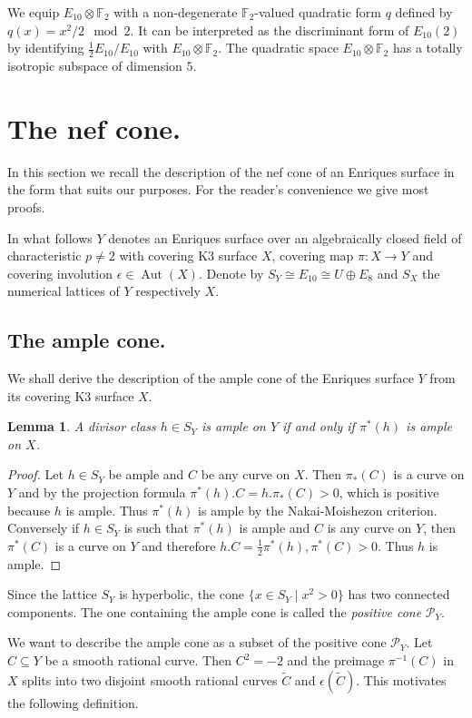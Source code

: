 \documentclass{amsart}
\theoremstyle{definition}
\theoremstyle{plain}
\newtheorem{lemma}[definition]{Lemma}
\DeclareMathOperator{\Aut}{Aut}
\newcommand{\FF}{\mathbb{F}}
\begin{document}
We equip $E_{10} \otimes \FF_2$ with a non-degenerate $\FF_2$-valued quadratic form $q$ defined by $q(x)= x^2/2 \mod 2$.
It can be interpreted as the discriminant form of $E_{10}(2)$ by identifying $\tfrac{1}{2}E_{10}/E_{10}$ with $E_{10}\otimes \FF_2$. The quadratic space $E_{10} \otimes \FF_2$ has a totally isotropic subspace of dimension $5$.


\section{The nef cone.} \label{sect:nef-cone}
In this section we recall the description of the nef cone of an Enriques surface in the form that suits our purposes. For the reader's convenience we give most proofs.

In what follows $Y$ denotes an Enriques surface over an algebraically closed field of characteristic $p\neq 2$ with covering K3 surface $X$, covering map $\pi\colon X \to Y$ and covering involution $\epsilon \in \Aut(X)$.
Denote by $S_Y\cong E_{10}\cong U \oplus E_8$ and $S_X$ the numerical lattices of $Y$ respectively $X$.

\subsection{The ample cone.}
We shall derive the description of the ample cone of the Enriques surface $Y$ from its covering K3 surface $X$.
\begin{lemma}\label{lem:ampleY}
A divisor class $h \in S_Y$ is ample on $Y$ if and only if $\pi^*(h)$ is ample on $X$.
\end{lemma}
\begin{proof}
Let $h \in S_Y$ be ample and $C$ be any curve on $X$. Then $\pi_*(C)$ is a curve on $Y$ and
by the projection formula $\pi^*(h).C = h.\pi_*(C)>0$, which is positive because $h$ is ample.
Thus $\pi^*(h)$ is ample by the Nakai-Moishezon criterion.
Conversely if $h \in S_Y$ is such that $\pi^*(h)$ is ample and $C$ is any curve on $Y$,
then $\pi^*(C)$ is a curve on $Y$ and therefore $h.C = \frac{1}{2} \pi^*(h),\pi^*(C)>0$. Thus $h$ is ample.
\end{proof}

Since the lattice $S_Y$ is hyperbolic, the cone $\{ x \in S_Y \mid x^2>0\}$ has two connected components.
The one containing the ample cone is called the \emph{positive cone} $\mathcal{P}_Y$.

We want to describe the ample cone as a subset of the positive cone $\mathcal{P}_Y$. Let $C \subseteq Y$ be a smooth rational curve.
Then $C^2=-2$ and the preimage $\pi^{-1}(C)$ in $X$ splits into two disjoint smooth rational curves $\tilde{C}$ and $\epsilon(\tilde{C})$. This motivates the following definition.
\end{document}
